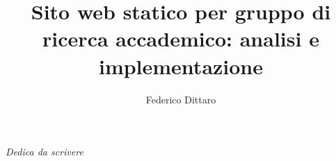 \documentclass[target=bach,aauheader=]{thud}
\title{Sito web statico per gruppo di ricerca accademico: analisi e implementazione}
\author{Federico Dittaro}
\begin{document}
\maketitle

\newpage 
\begin{flushright}
     
    \textit{Dedica da scrivere}
\end{flushright} 
 
\tableofcontents



\mainmatter



\end{document}
